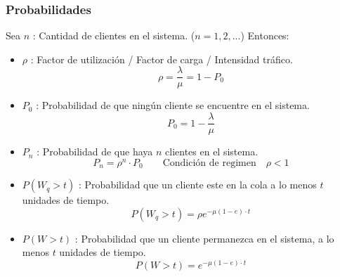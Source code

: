 \documentclass{templateNote}
\begin{document}
\subsubsection{Probabilidades}
Sea $n$ : Cantidad de clientes en el sistema. ($n=1,2,...$)
Entonces:
\begin{itemize}
    \item $\rho$ : Factor de utilizaci\'on / Factor de carga / Intensidad tr\'afico.
    \begin{equation*}
        \rho = \frac{\lambda}{\mu} = 1 - P_0
    \end{equation*}
    \item $P_0$ : Probabilidad de que ning\'un cliente se encuentre en el sistema.
    \begin{equation*}
        P_0 = 1 - \frac{\lambda}{\mu}
    \end{equation*}
    
    \item $P_n$ : Probabilidad de que haya $n$ clientes en el sistema.
    \begin{equation*}
        P_n = \rho^n \cdot P_0 \qquad \text{Condici\'on de regimen} \quad \rho < 1
    \end{equation*}

    \item $P(W_q > t)$ : Probabilidad que un cliente este en la cola a lo menos $t$ unidades de tiempo.
    \begin{equation*}
        P(W_q > t) = \rho e^{-\mu(1 - e)\cdot t}
    \end{equation*}

    \item $P(W > t)$ : Probabilidad que un cliente permanezca en el sistema, a lo menos $t$ unidades de tiempo.
    \begin{equation*}
        P(W > t) = e^{-\mu(1 - e)\cdot t}
    \end{equation*}
\end{itemize}

\newpage
\end{document}
